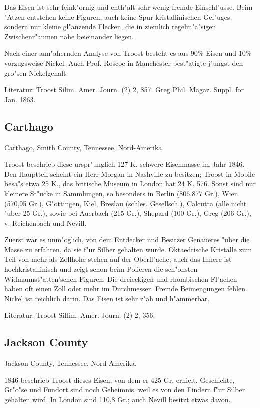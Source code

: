 \documentclass[a4paper, 11pt, oneside]{article}
\begin{document}
Das Eisen ist sehr feink"ornig und enth"alt sehr wenig fremde Einschl"usse. Beim "Atzen entstehen keine Figuren, auch keine Spur kristallinischen Gef"uges, sondern nur kleine gl"anzende Flecken, die in ziemlich regelm"a"sigen Zwischenr"aumen nahe beieinander liegen.

Nach einer ann"ahernden Analyse von Troost besteht es aus 90\% Eisen und 10\% vorzugsweise Nickel. Auch Prof. Roscoe in Manchester best"atigte j"ungst den gro"sen Nickelgehalt.

Literatur: Troost Silim. Amer. Journ. (2) 2, 857. Greg Phil. Magaz. Suppl. for Jan. 1863.

\subsection{Carthago}

Carthago, Smith County, Tennessee, Nord-Amerika.

Troost beschrieb diese urspr"unglich 127 K. schwere Eisenmasse im Jahr 1846. Den Hauptteil scheint ein Herr Morgan in Nashville zu besitzen; Troost in Mobile besa"s etwa 25 K., das britische Museum in London hat 24 K. 576. Sonst sind nur kleinere St"ucke in Sammlungen, so besonders in Berlin (806,877 Gr.), Wien (570,95 Gr.), G"ottingen, Kiel, Breslau (schles. Gesellsch.), Calcutta (alle nicht "uber 25 Gr.), sowie bei Auerbach (215 Gr.), Shepard (100 Gr.), Greg (206 Gr.), v. Reichenbach und Nevill.

Zuerst war es unm"oglich, von dem Entdecker und Besitzer Genaueres "uber die Masse zu erfahren, da sie f"ur Silber gehalten wurde. Oktaedrische Kristalle zum Teil von mehr als Zollhohe stehen auf der Oberfl"ache; auch das Innere ist hochkristallinisch und zeigt schon beim Polieren die sch"onsten Widmannst"atten'schen Figuren. Die dreieckigen und rhombischen Fl"achen haben oft einen Zoll oder mehr im Durchmesser. Fremde Beimengungen fehlen. Nickel ist reichlich darin. Das Eisen ist sehr z"ah und h"ammerbar.

Literatur: Troost Sillim. Amer. Journ. (2) 2, 356.

\subsection{Jackson County}

Jackson County, Tennessee, Nord-Amerika.

1846 beschrieb Troost dieses Eisen, von dem er 425 Gr. erhielt. Geschichte, Gr"o"se und Fundort sind noch Geheimnis, weil es von den Findern f"ur Silber gehalten wird. In London sind 110,8 Gr.; auch Nevill besitzt etwas davon.
\end{document}
